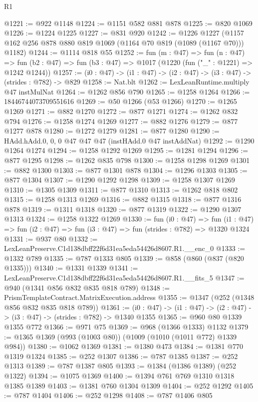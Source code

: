 \begin{lexlean}{R1}
\begin{coremodule}
@1221 := @922 @1148
@1224 := @1151 @582 @881 @878
@1225 := @820 @1069
@1226 := @1224 @1225
@1227 := @831 @920
@1242 := @1226
    @1227
    (@1157 @162 @256 @878 @880 @819 @1069 (@1164 @70 @819 (@1089 (@1167 @70))) @1182)
@1244 := @1114 @818 @55
@1252 := fun (m : @47) =>
  fun (n : @47) =>
  fun (b2 : @47) => fun (b3 : @47) => @1017 (@1220 (fun ("_" : @1221) => @1242 @1244))
@1257 := (i0 : @47) -> (i1 : @47) -> (i2 : @47) -> (i3 : @47) -> (strides : @782) -> @829
@1258 := Nat.blt
@1262 := LexLeanRuntime.multiply @47 instMulNat
@1264 := @1262 @856 @790
@1265 := @1258 @1264
@1266 := 18446744073709551616
@1269 := @50 @1266 (@53 @1266)
@1270 := @1265 @1269
@1271 := @882 @1270
@1272 := @877 @1271
@1274 := @1262 @832 @794
@1276 := @1258 @1274 @1269
@1277 := @882 @1276
@1279 := @877 @1277 @878
@1280 := @1272 @1279
@1281 := @877 @1280
@1290 := HAdd.hAdd.{0, 0, 0} @47 @47 @47 (instHAdd.{0} @47 instAddNat)
@1292 := @1290 @1264 @1274
@1294 := @1258 @1292 @1269
@1295 := @1281 @1294
@1296 := @877 @1295
@1298 := @1262 @835 @798
@1300 := @1258 @1298 @1269
@1301 := @882 @1300
@1303 := @877 @1301 @878
@1304 := @1296 @1303
@1305 := @877 @1304
@1307 := @1290 @1292 @1298
@1309 := @1258 @1307 @1269
@1310 := @1305 @1309
@1311 := @877 @1310
@1313 := @1262 @818 @802
@1315 := @1258 @1313 @1269
@1316 := @882 @1315
@1318 := @877 @1316 @878
@1319 := @1311 @1318
@1320 := @877 @1319
@1322 := @1290 @1307 @1313
@1324 := @1258 @1322 @1269
@1330 := fun (i0 : @47) =>
  fun (i1 : @47) => fun (i2 : @47) => fun (i3 : @47) => fun (strides : @782) => @1320 @1324
@1331 := @937 @80
@1332 := LexLeanPreserve.C1d138dbff22f6d31ea5eda54426d8607.R1.__enc_0
@1333 := @1332 @789
@1335 := @787 @1333 @805
@1339 := @858 (@860 (@837 (@820 @1335)))
@1340 := @1331 @1339
@1341 := LexLeanPreserve.C1d138dbff22f6d31ea5eda54426d8607.R1.__fits_5
@1347 := @940 (@1341 @856 @832 @835 @818 @789)
@1348 := PrismTemplateContract.MatrixExecution.address
@1355 := @1347 (@252 (@1348 @856 @832 @835 @818 @789))
@1361 := (i0 : @47) -> (i1 : @47) -> (i2 : @47) -> (i3 : @47) -> (strides : @782) -> @1340 @1355
@1365 := @960 @80 @1339 @1355 @772
@1366 := @971 @75
@1369 := @968 (@1366 @1333) @1132
@1379 := @1365 @1369 (@993 (@1003 @80)) (@1009 (@1010 (@1011 @772) @1339 @984))
@1380 := @1062 @1369
@1381 := @1380 @473
@1384 := @1381 @770 @1319 @1324
@1385 := @252 @1307
@1386 := @787 @1385
@1387 := @252 @1313
@1389 := @787 @1387 @805
@1393 := @1384 (@1386 @1389) (@252 @1322)
@1394 := @1075 @1369
@1400 := @1394 @761 @769 @1310 @1318 @1385 @1389
@1403 := @1381 @760 @1304 @1309
@1404 := @252 @1292
@1405 := @787 @1404
@1406 := @252 @1298
@1408 := @787 @1406 @805

\end{coremodule}
\end{lexlean}
